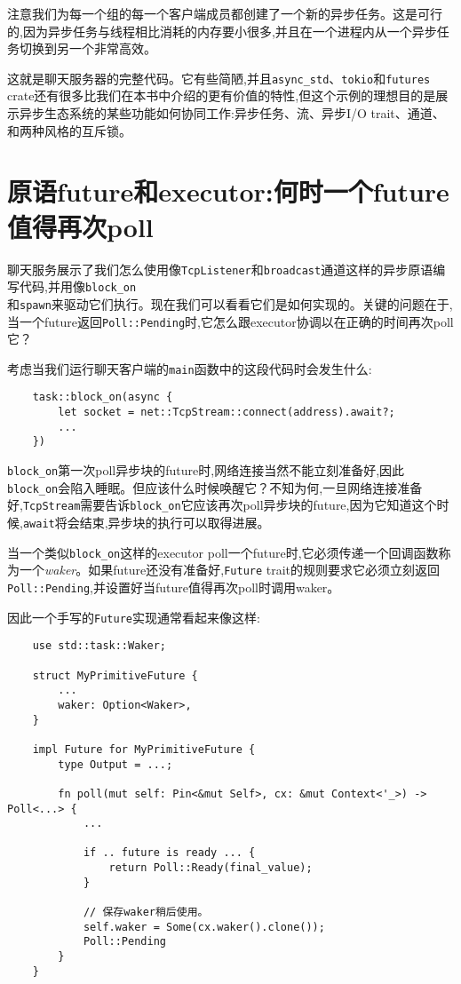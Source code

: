 注意我们为每一个组的每一个客户端成员都创建了一个新的异步任务。这是可行的,因为异步任务与线程相比消耗的内存要小很多,并且在一个进程内从一个异步任务切换到另一个非常高效。

这就是聊天服务器的完整代码。它有些简陋,并且\texttt{async\_std}、\texttt{tokio}和\texttt{futures} crate还有很多比我们在本书中介绍的更有价值的特性,但这个示例的理想目的是展示异步生态系统的某些功能如何协同工作:异步任务、流、异步I/O trait、通道、和两种风格的互斥锁。

\section{原语future和executor:何时一个future值得再次poll}\label{WhenPoll}
聊天服务展示了我们怎么使用像\texttt{TcpListener}和\texttt{broadcast}通道这样的异步原语编写代码,并用像\texttt{block\_on}\\
和\texttt{spawn}来驱动它们执行。现在我们可以看看它们是如何实现的。关键的问题在于,当一个future返回\texttt{Poll::Pending}时,它怎么跟executor协调以在正确的时间再次poll它？

考虑当我们运行聊天客户端的\texttt{main}函数中的这段代码时会发生什么:
\begin{verbatim}
    task::block_on(async {
        let socket = net::TcpStream::connect(address).await?;
        ...
    })
\end{verbatim}

\texttt{block\_on}第一次poll异步块的future时,网络连接当然不能立刻准备好,因此\texttt{block\_on}会陷入睡眠。但应该什么时候唤醒它？不知为何,一旦网络连接准备好,\texttt{TcpStream}需要告诉\texttt{block\_on}它应该再次poll异步块的future,因为它知道这个时候,\texttt{await}将会结束,异步块的执行可以取得进展。

当一个类似\texttt{block\_on}这样的executor poll一个future时,它必须传递一个回调函数称为一个\emph{waker}。如果future还没有准备好,\texttt{Future} trait的规则要求它必须立刻返回\texttt{Poll::Pending},并设置好当future值得再次poll时调用waker。

因此一个手写的\texttt{Future}实现通常看起来像这样:
\begin{verbatim}
    use std::task::Waker;

    struct MyPrimitiveFuture {
        ...
        waker: Option<Waker>,
    }

    impl Future for MyPrimitiveFuture {
        type Output = ...;

        fn poll(mut self: Pin<&mut Self>, cx: &mut Context<'_>) -> Poll<...> {
            ...

            if .. future is ready ... {
                return Poll::Ready(final_value);
            }

            // 保存waker稍后使用。
            self.waker = Some(cx.waker().clone());
            Poll::Pending
        }
    }
\end{verbatim}

